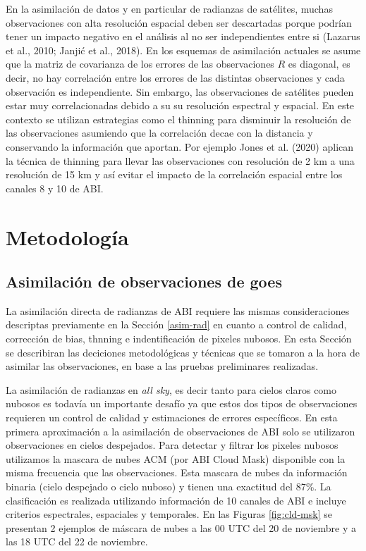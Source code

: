 \documentclass[12pt,oneside,a4paper]{reedthesis}
\begin{document}
En la asimilación de datos y en particular de radianzas de satélites, muchas observaciones con alta resolución espacial deben ser descartadas porque podrían tener un impacto negativo en el análisis al no ser independientes entre si (Lazarus et al., 2010; Janjić et al., 2018). En los esquemas de asimilación actuales se asume que la matriz de covarianza de los errores de las observaciones \(R\) es diagonal, es decir, no hay correlación entre los errores de las distintas observaciones y cada observación es independiente. Sin embargo, las observaciones de satélites pueden estar muy correlacionadas debido a su su resolución espectral y espacial. En este contexto se utilizan estrategias como el thinning para disminuir la resolución de las observaciones asumiendo que la correlación decae con la distancia y conservando la información que aportan. Por ejemplo Jones et al. (2020) aplican la técnica de thinning para llevar las observaciones con resolución de 2 km a una resolución de 15 km y así evitar el impacto de la correlación espacial entre los canales 8 y 10 de ABI.

\hypertarget{metodologuxeda-2}{%
\section{Metodología}\label{metodologuxeda-2}}

\hypertarget{asim-abi}{%
\subsection{Asimilación de observaciones de goes}\label{asim-abi}}

La asimilación directa de radianzas de ABI requiere las mismas consideraciones descriptas previamente en la Sección \ref{asim-rad} en cuanto a control de calidad, corrección de bias, thnning e indentificación de pixeles nubosos. En esta Sección se describiran las deciciones metodológicas y técnicas que se tomaron a la hora de asimilar las observaciones, en base a las pruebas preliminares realizadas.

La asimilación de radianzas en \emph{all sky}, es decir tanto para cielos claros como nubosos es todavía un importante desafío ya que estos dos tipos de observaciones requieren un control de calidad y estimaciones de errores específicos. En esta primera aproximación a la asimilación de observaciones de ABI solo se utilizaron observaciones en cielos despejados. Para detectar y filtrar los pixeles nubosos utilizamos la mascara de nubes ACM (por ABI Cloud Mask) disponible con la misma frecuencia que las observaciones. Esta mascara de nubes da información binaria (cielo despejado o cielo nuboso) y tienen una exactitud del 87\%. La clasificación es realizada utilizando información de 10 canales de ABI e incluye criterios espectrales, espaciales y temporales. En las Figuras \ref{fig:cld-msk} se presentan 2 ejemplos de máscara de nubes a las 00 UTC del 20 de noviembre y a las 18 UTC del 22 de noviembre.
\end{document}
